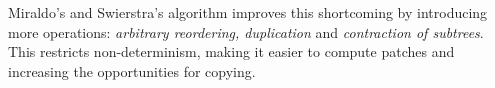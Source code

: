 Miraldo's and Swierstra's algorithm improves this shortcoming by introducing more operations: \textit{arbitrary reordering, duplication} and \textit{contraction of subtrees}. This restricts non-determinism, making it easier to compute patches and increasing the opportunities for copying.


    


